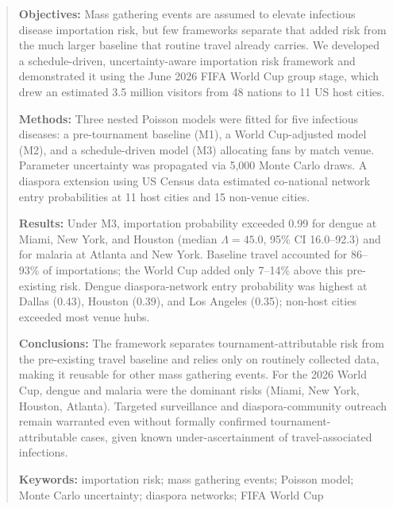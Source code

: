 \documentclass[12pt, a4paper]{article}
\begin{document}
\newpage

\begin{abstract}
\noindent\textbf{Objectives:}
Mass gathering events are assumed to elevate infectious disease importation risk, but few frameworks separate that added risk from the much larger baseline that routine travel already carries. We developed a schedule-driven, uncertainty-aware importation risk framework and demonstrated it using the June 2026 FIFA World Cup group stage, which drew an estimated 3.5 million visitors from 48 nations to 11 US host cities.

\medskip
\noindent\textbf{Methods:}
Three nested Poisson models were fitted for five infectious diseases: a pre-tournament baseline (M1), a World Cup-adjusted model (M2), and a schedule-driven model (M3) allocating fans by match venue. Parameter uncertainty was propagated via 5,000 Monte Carlo draws. A diaspora extension using US Census data estimated co-national network entry probabilities at 11 host cities and 15 non-venue cities.

\medskip
\noindent\textbf{Results:}
Under M3, importation probability exceeded 0.99 for dengue at Miami, New York, and Houston (median $\Lambda = 45.0$, 95\% CI 16.0--92.3) and for malaria at Atlanta and New York. Baseline travel accounted for 86--93\% of importations; the World Cup added only 7--14\% above this pre-existing risk. Dengue diaspora-network entry probability was highest at Dallas (0.43), Houston (0.39), and Los Angeles (0.35); non-host cities exceeded most venue hubs.

\medskip
\noindent\textbf{Conclusions:}
The framework separates tournament-attributable risk from the pre-existing travel baseline and relies only on routinely collected data, making it reusable for other mass gathering events. For the 2026 World Cup, dengue and malaria were the dominant risks (Miami, New York, Houston, Atlanta). Targeted surveillance and diaspora-community outreach remain warranted even without formally confirmed tournament-attributable cases, given known under-ascertainment of travel-associated infections.

\medskip
\noindent\textbf{Keywords:} importation risk; mass gathering events; Poisson model; Monte Carlo uncertainty; diaspora networks; FIFA World Cup
\end{abstract}

\newpage

\end{document}
